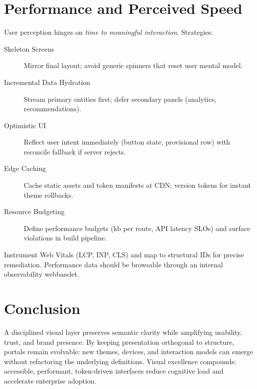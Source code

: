 \section{Performance and Perceived Speed}
User perception hinges on \textit{time to meaningful interaction}. Strategies:
\begin{description}
	\item[Skeleton Screens] Mirror final layout; avoid generic spinners that reset user mental model.
	\item[Incremental Data Hydration] Stream primary entities first; defer secondary panels (analytics, recommendations).
	\item[Optimistic UI] Reflect user intent immediately (button state, provisional row) with reconcile fallback if server rejects.
	\item[Edge Caching] Cache static assets and token manifests at CDN; version tokens for instant theme rollbacks.
	\item[Resource Budgeting] Define performance budgets (kb per route, API latency SLOs) and surface violations in build pipeline.
\end{description}
Instrument Web Vitals (LCP, INP, CLS) and map to structural IDs for precise remediation. Performance data should be browsable through an internal observability webbaselet.

\section{Conclusion}
A disciplined visual layer preserves semantic clarity while amplifying usability, trust, and brand presence. By keeping presentation orthogonal to structure, portals remain evolvable: new themes, devices, and interaction models can emerge without refactoring the underlying \wbdl{} definitions. Visual excellence compounds: accessible, performant, token-driven interfaces reduce cognitive load and accelerate enterprise adoption.

